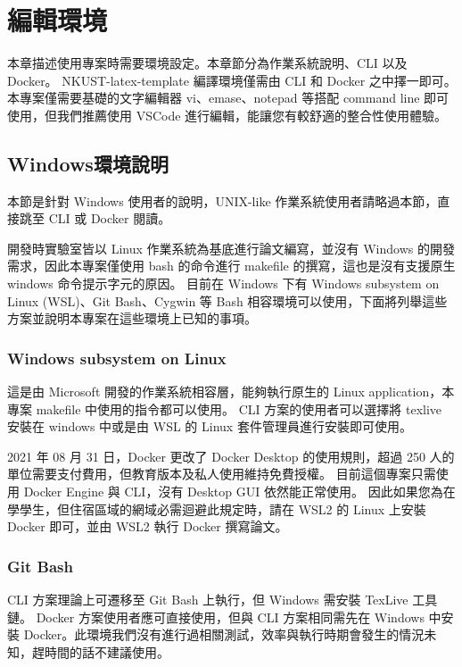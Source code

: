\chapter{編輯環境} \label{ch_enviornment}

本章描述使用專案時需要環境設定。本章節分為作業系統說明、CLI 以及 Docker。
NKUST-latex-template 編譯環境僅需由 CLI 和 Docker 之中擇一即可。
本專案僅需要基礎的文字編輯器 vi、emase、notepad 等搭配 command line 即可使用，但我們推薦使用 VSCode 進行編輯，能讓您有較舒適的整合性使用體驗。

\section{Windows環境說明}

本節是針對 Windows 使用者的說明，UNIX-like 作業系統使用者請略過本節，直接跳至 CLI 或 Docker 閱讀。

開發時實驗室皆以 Linux 作業系統為基底進行論文編寫，並沒有 Windows 的開發需求，因此本專案僅使用 bash 的命令進行 makefile 的撰寫，這也是沒有支援原生 windows 命令提示字元的原因。
目前在 Windows 下有 Windows subsystem on Linux (WSL)、Git Bash、Cygwin 等 Bash 相容環境可以使用，下面將列舉這些方案並說明本專案在這些環境上已知的事項。

\subsection{Windows subsystem on Linux}

這是由 Microsoft 開發的作業系統相容層，能夠執行原生的 Linux application，本專案 makefile 中使用的指令都可以使用。
CLI 方案的使用者可以選擇將 texlive 安裝在 windows 中或是由 WSL 的 Linux 套件管理員進行安裝即可使用。

2021 年 08 月 31 日，Docker 更改了 Docker Desktop 的使用規則，超過 250 人的單位需要支付費用，但教育版本及私人使用維持免費授權。
目前這個專案只需使用 Docker Engine 與 CLI，沒有 Desktop GUI 依然能正常使用。
因此如果您為在學學生，但住宿區域的網域必需迴避此規定時，請在 WSL2 的 Linux 上安裝 Docker 即可，並由 WSL2 執行 Docker 撰寫論文。

\subsection{Git Bash}

CLI 方案理論上可遷移至 Git Bash 上執行，但 Windows 需安裝 TexLive 工具鏈。
Docker 方案使用者應可直接使用，但與 CLI 方案相同需先在 Windows 中安裝 Docker。此環境我們沒有進行過相關測試，效率與執行時期會發生的情況未知，趕時間的話不建議使用。

